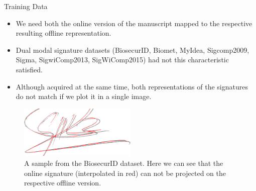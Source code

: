 \documentclass{beamer}
\begin{document}
\begin{frame}{Training Data}
\begin{itemize}
\item We need both the online version of the manuscript mapped to the respective resulting offline representation.
\item Dual modal signature datasets (BiosecurID, Biomet, MyIdea, Sigcomp2009, Sigma, SigwiComp2013, SigWiComp2015) had not this characteristic satisfied. 
\item Although acquired at the same time, both representations of the signatures do not match if we plot it in a single image.
\end{itemize}


\begin{figure}[!htb]

\centering
\includegraphics[width=0.5\textwidth]{onoff}
\caption{A sample from the BiosecurID dataset. Here we can see that the online signature (interpolated in red) can not be projected on the respective offline version.}
\label{fig:onoff}
\end{figure}

\end{frame}
\end{document}
